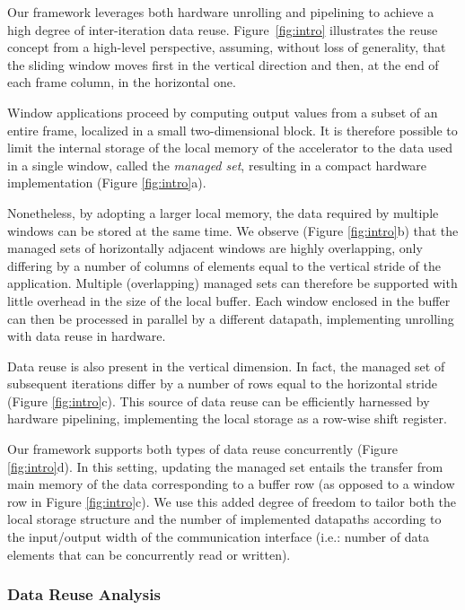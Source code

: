 \documentclass[]{usiinfthesis}
\begin{document}
Our framework leverages both hardware unrolling and pipelining to
achieve a high degree of inter-iteration data reuse.
Figure~\ref{fig:intro} illustrates the reuse concept from a
high-level perspective, assuming, without loss of generality,
that the sliding window moves first in the vertical direction and
then, at the end of each frame column, in the horizontal one. 

Window applications proceed by computing
output values from a subset of an entire frame, localized in a small
two-dimensional block. It is therefore possible to limit the internal
storage of the local memory of the accelerator to the data used in a
single window, called the \emph{managed set}, resulting in a compact 
hardware implementation (Figure \ref{fig:intro}a). 

Nonetheless, by adopting a larger local memory, the data required by
multiple windows can be stored at the same time. We observe
(Figure \ref{fig:intro}b) that the managed sets of horizontally
adjacent windows are highly overlapping, only differing by a number of columns of elements equal to
the vertical stride of the application. Multiple (overlapping) managed sets can
therefore be supported with little overhead in the size of the local buffer.
Each window enclosed in the buffer can
then be processed in parallel by a different datapath, implementing unrolling with data reuse
in hardware.

Data reuse is also present in the vertical dimension. In fact, the
managed set of subsequent iterations differ by a number of
rows equal to the horizontal stride (Figure \ref{fig:intro}c). This
source of data reuse can be efficiently harnessed by hardware pipelining, 
implementing the local storage as a row-wise shift register. 

Our framework supports both types of data reuse concurrently
(Figure \ref{fig:intro}d). In this setting, updating the
managed set entails the transfer from main memory of the data
corresponding to a buffer row (as opposed to a window row in Figure
\ref{fig:intro}c).  We use this added
degree of freedom to tailor both the local storage structure and the
number of implemented datapaths according to the input/output width 
of the communication interface (i.e.: number of data elements that can be concurrently read or written).

\subsubsection{Data Reuse Analysis}
\label{subsec:reuse-analysis}
\end{document}
